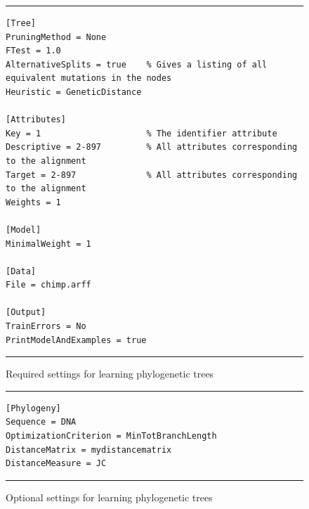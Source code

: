 \documentclass[a4paper]{report}
\begin{document}
\begin{figure}[tb]
\hrule\vspace{1em}
\begin{verbatim}
[Tree]
PruningMethod = None    
FTest = 1.0    
AlternativeSplits = true    % Gives a listing of all equivalent mutations in the nodes 
Heuristic = GeneticDistance

[Attributes]
Key = 1                     % The identifier attribute
Descriptive = 2-897         % All attributes corresponding to the alignment
Target = 2-897              % All attributes corresponding to the alignment
Weights = 1

[Model]
MinimalWeight = 1
    
[Data]
File = chimp.arff

[Output]
TrainErrors = No
PrintModelAndExamples = true
\end{verbatim}
\hrule
\caption{Required settings for learning phylogenetic trees}
\label{phylosettingsreq:fig}
\end{figure}

\begin{figure}[tb]
\hrule\vspace{1em}
\begin{verbatim}
[Phylogeny]
Sequence = DNA
OptimizationCriterion = MinTotBranchLength
DistanceMatrix = mydistancematrix
DistanceMeasure = JC
\end{verbatim}
\hrule
\caption{Optional settings for learning phylogenetic trees}
\label{phylosettingsopt:fig}
\end{figure}
\end{document}
